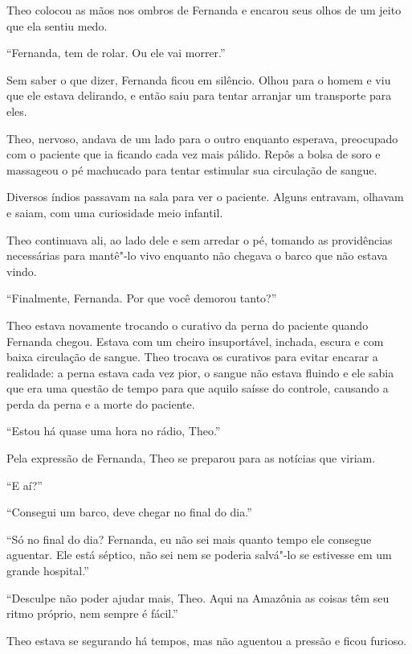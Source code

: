 Theo colocou as mãos nos ombros de Fernanda e encarou seus olhos de um
jeito que ela sentiu medo.

``Fernanda, tem de rolar. Ou ele vai morrer.''

Sem saber o que dizer, Fernanda ficou em silêncio. Olhou para o homem e
viu que ele estava delirando, e então saiu para tentar arranjar um
transporte para eles.

Theo, nervoso, andava de um lado para o outro enquanto esperava,
preocupado com o paciente que ia ficando cada vez mais pálido. Repôs a
bolsa de soro e massageou o pé machucado para tentar estimular sua
circulação de sangue.

Diversos índios passavam na sala
para ver o paciente. Alguns entravam, olhavam e saiam, com uma
curiosidade meio infantil.

Theo continuava ali, ao lado dele e sem
arredar o pé, tomando as providências necessárias para mantê"-lo vivo
enquanto não chegava o barco que não estava vindo.

\asterisc


``Finalmente, Fernanda. Por que você demorou tanto?''

Theo estava novamente trocando o curativo da perna do paciente quando
Fernanda chegou. Estava com um cheiro insuportável, inchada,
escura e com baixa circulação de sangue. Theo trocava os curativos para
evitar encarar a realidade: a perna estava cada vez pior, o sangue
não estava fluindo e ele sabia que era uma questão de tempo para que
aquilo saísse do controle, causando a perda da perna e a morte do
paciente.

``Estou há quase uma hora no rádio, Theo.''

Pela expressão de Fernanda, Theo se preparou para as notícias que
viriam.

``E aí?''

``Consegui um barco, deve chegar no final do dia.''

``Só no final do dia? Fernanda, eu não sei mais quanto tempo ele
consegue aguentar. Ele está séptico, não sei nem se poderia salvá"-lo se
estivesse em um grande hospital.''

``Desculpe não poder ajudar mais, Theo. Aqui na Amazônia as coisas têm
seu ritmo próprio, nem sempre é fácil.''

Theo estava se segurando há tempos, mas não aguentou a pressão e ficou
furioso.

